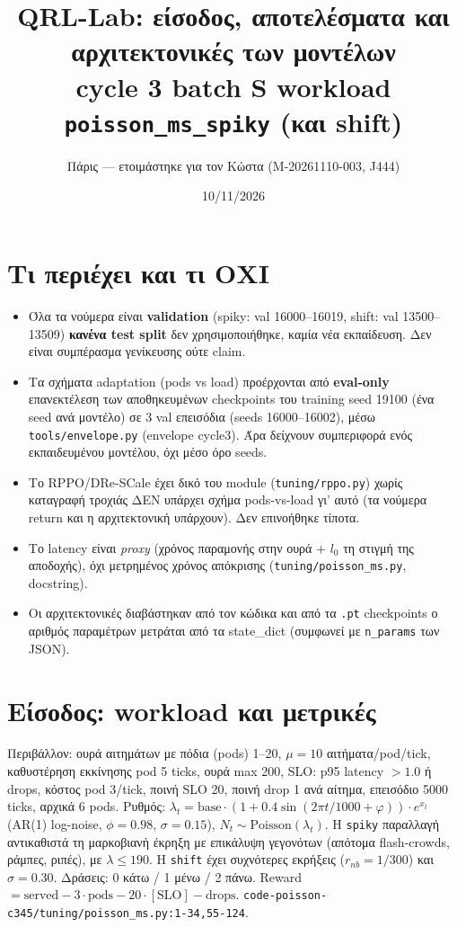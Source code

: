 \documentclass[10pt,a4paper]{article}
\title{QRL-Lab: είσοδος, αποτελέσματα και αρχιτεκτονικές των μοντέλων\\\large cycle 3 \textperiodcentered{} batch S \textperiodcentered{} workload \texttt{poisson\_ms\_spiky} (και shift)}
\author{Πάρις --- ετοιμάστηκε για τον Κώστα (M-20261110-003, J444)}\date{10/11/2026}
\newcommand{\ptr}[1]{{\footnotesize\texttt{#1}}}
\begin{document}
\maketitle
\section{Τι περιέχει και τι ΟΧΙ}
\begin{itemize}
\item Όλα τα νούμερα είναι \textbf{validation} (spiky: val 16000--16019, shift: val 13500--13509)\textperiodcentered{} \textbf{κανένα test split} δεν χρησιμοποιήθηκε, καμία νέα εκπαίδευση. Δεν είναι συμπέρασμα γενίκευσης ούτε claim.
\item Τα σχήματα adaptation (pods vs load) προέρχονται από \textbf{eval-only} επανεκτέλεση των αποθηκευμένων checkpoints του training seed 19100 (ένα seed ανά μοντέλο) σε 3 val επεισόδια (seeds 16000--16002), μέσω \ptr{tools/envelope.py} (envelope cycle3). Άρα δείχνουν συμπεριφορά ενός εκπαιδευμένου μοντέλου, όχι μέσο όρο seeds.
\item Το RPPO/DRe-SCale έχει δικό του module (\ptr{tuning/rppo.py}) χωρίς καταγραφή τροχιάς\textperiodcentered{} ΔΕΝ υπάρχει σχήμα pods-vs-load γι' αυτό (τα νούμερα return και η αρχιτεκτονική υπάρχουν). Δεν επινοήθηκε τίποτα.
\item Το latency είναι \emph{proxy} (χρόνος παραμονής στην ουρά + $l_0$ τη στιγμή της αποδοχής), όχι μετρημένος χρόνος απόκρισης (\ptr{tuning/poisson\_ms.py}, docstring).
\item Οι αρχιτεκτονικές διαβάστηκαν από τον κώδικα και από τα \texttt{.pt} checkpoints\textperiodcentered{} ο αριθμός παραμέτρων μετράται από τα state\_dict (συμφωνεί με \texttt{n\_params} των JSON).
\end{itemize}

\section{Είσοδος: workload και μετρικές}
Περιβάλλον: ουρά αιτημάτων με πόδια (pods) 1--20, $\mu=10$ αιτήματα/pod/tick, καθυστέρηση εκκίνησης pod 5 ticks, ουρά max 200, SLO: p95 latency $>1.0$ ή drops, κόστος pod 3/tick, ποινή SLO 20, ποινή drop 1 ανά αίτημα, επεισόδιο 5000 ticks, αρχικά 6 pods. Ρυθμός: $\lambda_t=\text{base}\cdot(1+0.4\sin(2\pi t/1000+\varphi))\cdot e^{x_t}$ (AR(1) log-noise, $\phi=0.98$, $\sigma=0.15$), $N_t\sim\text{Poisson}(\lambda_t)$. Η \texttt{spiky} παραλλαγή αντικαθιστά τη μαρκοβιανή έκρηξη με επικάλυψη γεγονότων (απότομα flash-crowds, ράμπες, ριπές), με $\lambda\le190$. Η \texttt{shift} έχει συχνότερες εκρήξεις ($r_{nb}=1/300$) και $\sigma=0.30$. Δράσεις: 0 κάτω / 1 μένω / 2 πάνω. Reward $=\text{served}-3\cdot\text{pods}-20\cdot[\text{SLO}]-\text{drops}$. \ptr{code-poisson-c345/tuning/poisson\_ms.py:1-34,55-124}.
\end{document}
